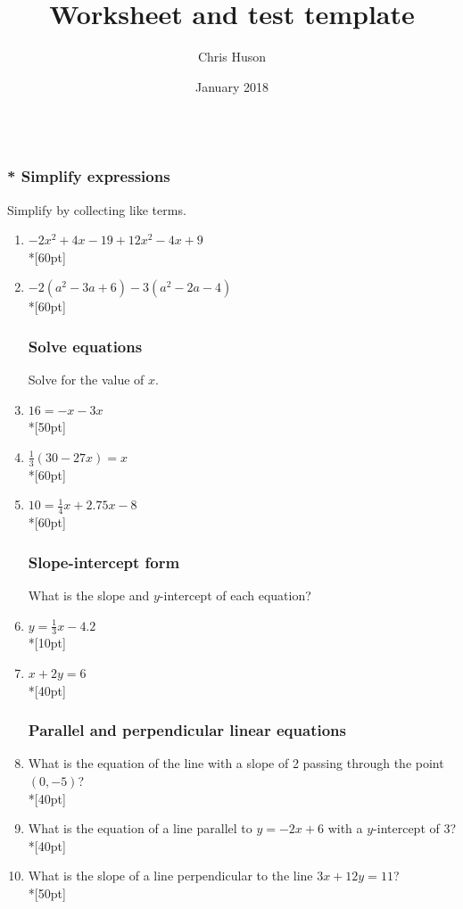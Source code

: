 \documentclass[12pt, oneside]{article}
\title{Worksheet and test template}
\author{Chris Huson}
\date{January 2018}
\begin{document}
\subsubsection*{\\* Simplify expressions}

Simplify by collecting like terms.

\begin{enumerate}

\item $-2x^2+4x -19 +12x^2-4x+9$\\*[60pt]
\item $-2(a^2-3a +6) -3(a^2-2a-4)$\\*[60pt]

\subsubsection*{Solve equations}

Solve for the value of $x$.
\item   $16=-x-3x$\\*[50pt]
\item   $\frac{1}{3}(30-27x)=x$\\*[60pt]
\item   $10=\frac{1}{4}x+2.75x-8$\\*[60pt]

\newpage
\subsubsection*{Slope-intercept form}

What is the slope and $y$-intercept of each equation? 
\item   $y=\frac{1}{3}x-4.2$\\*[10pt]
\item   $x+2y=6$\\*[40pt]


\subsubsection*{Parallel and perpendicular linear equations}

\item What is the equation of the line with a slope of 2 passing through the point $(0,-5)$?\\*[40pt]
\item What is the equation of a line parallel to $y=-2x+6$ with a $y$-intercept of 3?\\*[40pt]
\item What is the slope of a line perpendicular to the line $3x+12y=11$?\\*[50pt]


\end{enumerate}
\end{document}
